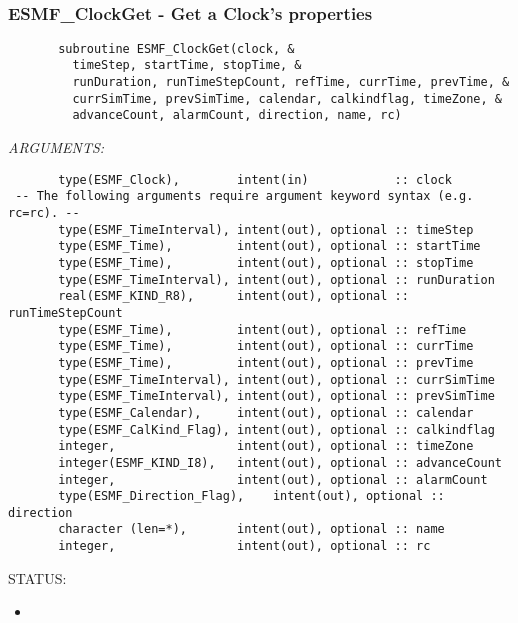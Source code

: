  
\mbox{}\hrulefill\ 
 
\subsubsection [ESMF\_ClockGet] {ESMF\_ClockGet - Get a Clock's properties}


 
\begin{verbatim}       subroutine ESMF_ClockGet(clock, &
         timeStep, startTime, stopTime, &
         runDuration, runTimeStepCount, refTime, currTime, prevTime, &
         currSimTime, prevSimTime, calendar, calkindflag, timeZone, &
         advanceCount, alarmCount, direction, name, rc)
 \end{verbatim}{\em ARGUMENTS:}
\begin{verbatim}       type(ESMF_Clock),        intent(in)            :: clock
 -- The following arguments require argument keyword syntax (e.g. rc=rc). --
       type(ESMF_TimeInterval), intent(out), optional :: timeStep
       type(ESMF_Time),         intent(out), optional :: startTime
       type(ESMF_Time),         intent(out), optional :: stopTime
       type(ESMF_TimeInterval), intent(out), optional :: runDuration
       real(ESMF_KIND_R8),      intent(out), optional :: runTimeStepCount
       type(ESMF_Time),         intent(out), optional :: refTime
       type(ESMF_Time),         intent(out), optional :: currTime
       type(ESMF_Time),         intent(out), optional :: prevTime
       type(ESMF_TimeInterval), intent(out), optional :: currSimTime
       type(ESMF_TimeInterval), intent(out), optional :: prevSimTime
       type(ESMF_Calendar),     intent(out), optional :: calendar
       type(ESMF_CalKind_Flag), intent(out), optional :: calkindflag
       integer,                 intent(out), optional :: timeZone
       integer(ESMF_KIND_I8),   intent(out), optional :: advanceCount
       integer,                 intent(out), optional :: alarmCount
       type(ESMF_Direction_Flag),    intent(out), optional :: direction
       character (len=*),       intent(out), optional :: name
       integer,                 intent(out), optional :: rc
 \end{verbatim}
{\sf STATUS:}
   \begin{itemize}
   \item{}
   \end{itemize}
  
